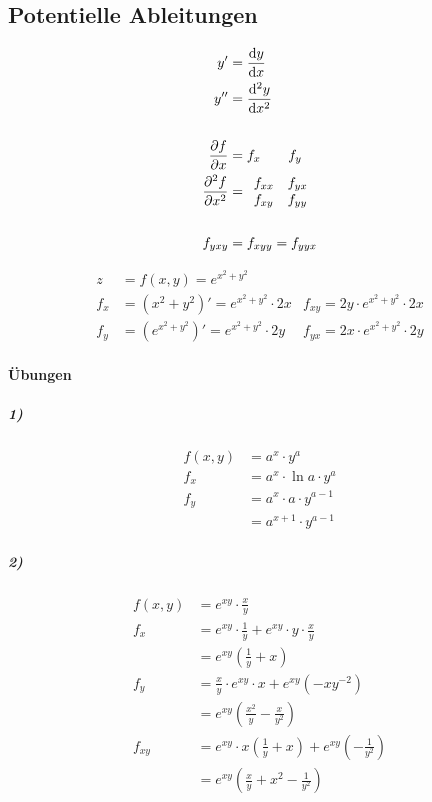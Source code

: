 \subsection{Potentielle Ableitungen}


\begin{align*}
    y' &= \frac{\mathop{}\!\mathrm{d} y}{\mathop{}\!\mathrm{d} x} \\
    y'' &= \frac{\mathop{}\!\mathrm{d}^2 y}{\mathop{}\!\mathrm{d} x^2} \\
    \\
    \frac{\partial f}{\partial x} &= f_x \qquad f_y \\
    \frac{\partial^2 f}{\partial x^2} &= 
    \begin{array}{ll}
        f_{xx} & f_{yx} \\
        f_{xy} & f_{yy}
    \end{array} \\
    \\
    f_{yxy} &= f_{xyy} = f_{yyx}
\end{align*}

\begin{align*}
    z &= f(x, y) = e^{x^2 + y^2} \\
    f_x &= \left( x^2 + y^2 \right)' = e^{x^2 + y^2} \cdot 2 x
    &f_{xy} = 2y \cdot e^{x^2 + y^2} \cdot 2x \\
    f_y &= \left( e^{x^2 + y^2} \right)' = e^{x^2 + y^2} \cdot 2 y
    &f_{yx} = 2x \cdot e^{x^2 + y^2} \cdot 2y
\end{align*}

\paragraph{Übungen}

\subparagraph{1)}

\begin{align*}
    f(x, y) &= a^x \cdot y^a \\
    f_x &= a^x \cdot \ln a \cdot y^a \\
    f_y &= a^x \cdot a \cdot y^{a-1} \\
    &= a^{x+1} \cdot y^{a-1}
\end{align*}

\subparagraph{2)}

\begin{align*}
    f(x, y) &= e^{x y} \cdot \frac{x}{y} \\
    f_x &= e^{x y} \cdot \frac{1}{y} + e^{x y} \cdot y \cdot \frac{x}{y} \\
    &= e^{x y} \left( \frac{1}{y} + x \right) \\
    f_y &= \frac{x}{y} \cdot e^{x y} \cdot x + e^{x y} \left(-x y^{-2} \right) \\
    &= e^{x y} \left( \frac{x^2}{y} - \frac{x}{y^2} \right) \\
    f_{xy} &= e^{x y} \cdot x \left( \frac{1}{y} + x \right) + e^{x y} \left( - \frac{1}{y^2} \right) \\
    &= e^{x y} \left( \frac{x}{y} + x^2 - \frac{1}{y^2} \right)
\end{align*}
